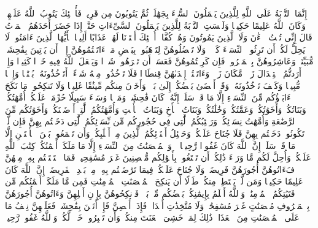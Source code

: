 \stopbuffer%
\startbuffer[\q:4:17]
إِنَّمَا ٱلتَّوۡبَةُ عَلَى ٱللَّهِ لِلَّذِینَ یَعۡمَلُونَ ٱلسُّوۤءَ بِجَهَٰلَةࣲ ثُمَّ یَتُوبُونَ مِن قَرِیبࣲ فَأُو۟لَٰۤئِكَ یَتُوبُ ٱللَّهُ عَلَیۡهِمۡۗ وَكَانَ ٱللَّهُ عَلِیمًا حَكِیمࣰا%
\stopbuffer%
\startbuffer[\q:4:18]
وَلَیۡسَتِ ٱلتَّوۡبَةُ لِلَّذِینَ یَعۡمَلُونَ ٱلسَّیِّءَاتِ حَتَّىٰۤ إِذَا حَضَرَ أَحَدَهُمُ ٱلۡمَوۡتُ قَالَ إِنِّی تُبۡتُ ٱلۡءَٰنَ وَلَا ٱلَّذِینَ یَمُوتُونَ وَهُمۡ كُفَّارٌۚ أُو۟لَٰۤئِكَ أَعۡتَدۡنَا لَهُمۡ عَذَابًا أَلِیمࣰا%
\stopbuffer%
\startbuffer[\q:4:19]
یَٰۤأَیُّهَا ٱلَّذِینَ ءَامَنُوا۟ لَا یَحِلُّ لَكُمۡ أَن تَرِثُوا۟ ٱلنِّسَاۤءَ كَرۡهࣰاۖ وَلَا تَعۡضُلُوهُنَّ لِتَذۡهَبُوا۟ بِبَعۡضِ مَاۤ ءَاتَیۡتُمُوهُنَّ إِلَّاۤ أَن یَأۡتِینَ بِفَٰحِشَةࣲ مُّبَیِّنَةࣲۚ وَعَاشِرُوهُنَّ بِٱلۡمَعۡرُوفِۚ فَإِن كَرِهۡتُمُوهُنَّ فَعَسَىٰۤ أَن تَكۡرَهُوا۟ شَیۡءࣰا وَیَجۡعَلَ ٱللَّهُ فِیهِ خَیۡرࣰا كَثِیرࣰا%
\stopbuffer%
\startbuffer[\q:4:20]
وَإِنۡ أَرَدتُّمُ ٱسۡتِبۡدَالَ زَوۡجࣲ مَّكَانَ زَوۡجࣲ وَءَاتَیۡتُمۡ إِحۡدَىٰهُنَّ قِنطَارࣰا فَلَا تَأۡخُذُوا۟ مِنۡهُ شَیۡءًاۚ أَتَأۡخُذُونَهُۥ بُهۡتَٰنࣰا وَإِثۡمࣰا مُّبِینࣰا%
\stopbuffer%
\startbuffer[\q:4:21]
وَكَیۡفَ تَأۡخُذُونَهُۥ وَقَدۡ أَفۡضَىٰ بَعۡضُكُمۡ إِلَىٰ بَعۡضࣲ وَأَخَذۡنَ مِنكُم مِّیثَٰقًا غَلِیظࣰا%
\stopbuffer%
\startbuffer[\q:4:22]
وَلَا تَنكِحُوا۟ مَا نَكَحَ ءَابَاۤؤُكُم مِّنَ ٱلنِّسَاۤءِ إِلَّا مَا قَدۡ سَلَفَۚ إِنَّهُۥ كَانَ فَٰحِشَةࣰ وَمَقۡتࣰا وَسَاۤءَ سَبِیلًا%
\stopbuffer%
\startbuffer[\q:4:23]
حُرِّمَتۡ عَلَیۡكُمۡ أُمَّهَٰتُكُمۡ وَبَنَاتُكُمۡ وَأَخَوَٰتُكُمۡ وَعَمَّٰتُكُمۡ وَخَٰلَٰتُكُمۡ وَبَنَاتُ ٱلۡأَخِ وَبَنَاتُ ٱلۡأُخۡتِ وَأُمَّهَٰتُكُمُ ٱلَّٰتِیۤ أَرۡضَعۡنَكُمۡ وَأَخَوَٰتُكُم مِّنَ ٱلرَّضَٰعَةِ وَأُمَّهَٰتُ نِسَاۤئِكُمۡ وَرَبَٰۤئِبُكُمُ ٱلَّٰتِی فِی حُجُورِكُم مِّن نِّسَاۤئِكُمُ ٱلَّٰتِی دَخَلۡتُم بِهِنَّ فَإِن لَّمۡ تَكُونُوا۟ دَخَلۡتُم بِهِنَّ فَلَا جُنَاحَ عَلَیۡكُمۡ وَحَلَٰۤئِلُ أَبۡنَاۤئِكُمُ ٱلَّذِینَ مِنۡ أَصۡلَٰبِكُمۡ وَأَن تَجۡمَعُوا۟ بَیۡنَ ٱلۡأُخۡتَیۡنِ إِلَّا مَا قَدۡ سَلَفَۗ إِنَّ ٱللَّهَ كَانَ غَفُورࣰا رَّحِیمࣰا%
\stopbuffer%
\startbuffer[\q:4:24]
۞ وَٱلۡمُحۡصَنَٰتُ مِنَ ٱلنِّسَاۤءِ إِلَّا مَا مَلَكَتۡ أَیۡمَٰنُكُمۡۖ كِتَٰبَ ٱللَّهِ عَلَیۡكُمۡۚ وَأُحِلَّ لَكُم مَّا وَرَاۤءَ ذَٰلِكُمۡ أَن تَبۡتَغُوا۟ بِأَمۡوَٰلِكُم مُّحۡصِنِینَ غَیۡرَ مُسَٰفِحِینَۚ فَمَا ٱسۡتَمۡتَعۡتُم بِهِۦ مِنۡهُنَّ فَءَاتُوهُنَّ أُجُورَهُنَّ فَرِیضَةࣰۚ وَلَا جُنَاحَ عَلَیۡكُمۡ فِیمَا تَرَٰضَیۡتُم بِهِۦ مِنۢ بَعۡدِ ٱلۡفَرِیضَةِۚ إِنَّ ٱللَّهَ كَانَ عَلِیمًا حَكِیمࣰا%
\stopbuffer%
\startbuffer[\q:4:25]
وَمَن لَّمۡ یَسۡتَطِعۡ مِنكُمۡ طَوۡلًا أَن یَنكِحَ ٱلۡمُحۡصَنَٰتِ ٱلۡمُؤۡمِنَٰتِ فَمِن مَّا مَلَكَتۡ أَیۡمَٰنُكُم مِّن فَتَیَٰتِكُمُ ٱلۡمُؤۡمِنَٰتِۚ وَٱللَّهُ أَعۡلَمُ بِإِیمَٰنِكُمۚ بَعۡضُكُم مِّنۢ بَعۡضࣲۚ فَٱنكِحُوهُنَّ بِإِذۡنِ أَهۡلِهِنَّ وَءَاتُوهُنَّ أُجُورَهُنَّ بِٱلۡمَعۡرُوفِ مُحۡصَنَٰتٍ غَیۡرَ مُسَٰفِحَٰتࣲ وَلَا مُتَّخِذَٰتِ أَخۡدَانࣲۚ فَإِذَاۤ أُحۡصِنَّ فَإِنۡ أَتَیۡنَ بِفَٰحِشَةࣲ فَعَلَیۡهِنَّ نِصۡفُ مَا عَلَى ٱلۡمُحۡصَنَٰتِ مِنَ ٱلۡعَذَابِۚ ذَٰلِكَ لِمَنۡ خَشِیَ ٱلۡعَنَتَ مِنكُمۡۚ وَأَن تَصۡبِرُوا۟ خَیۡرࣱ لَّكُمۡۗ وَٱللَّهُ غَفُورࣱ رَّحِیمࣱ%
